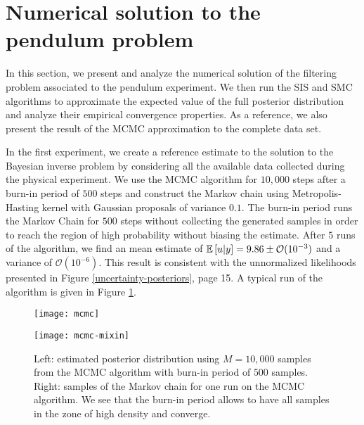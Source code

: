 \section{Numerical solution to the pendulum problem}
In this section, we present and analyze the numerical solution of the filtering problem associated to the pendulum experiment. We then run the SIS and SMC algorithms to approximate the expected value of the full posterior distribution and analyze their empirical convergence properties. As a reference, we also present the result of the MCMC approximation to the complete data set.

In the first experiment, we create a reference estimate to the solution to the Bayesian inverse problem by considering all the available data collected during the physical experiment. We use the MCMC algorithm for $10,000$ steps after a burn-in period of $500$ steps and construct the Markov chain using Metropolis-Hasting kernel with Gaussian proposals of variance $0.1$. The burn-in period runs the Markov Chain for $500$ steps without collecting the generated samples in order to reach the region of high probability without biasing the estimate. After $5$ runs of the algorithm, we find an mean estimate of $\mathbb{E}\left[u|y\right] = 9.86 \pm \mathcal{O}(10^{-3})$ and a variance of $\mathcal{O}(10^{-6})$. This result is consistent with the unnormalized likelihoods presented in Figure \ref{uncertainty-posteriors}, page 15. A typical run of the algorithm is given in Figure \ref{mcmc-figure}.

\begin{figure}[!t]
  \label{mcmc-figure}
  \begin{minipage}{.43\textwidth}
    \texttt{[image: mcmc]}
  \end{minipage}
  \begin{minipage}{.5\textwidth}
    \texttt{[image: mcmc-mixin]}
  \end{minipage}
  \caption{Left: estimated posterior distribution using $M=10,000$ samples from the MCMC algorithm with burn-in period of $500$ samples. Right: samples of the Markov chain for one run on the MCMC algorithm. We see that the burn-in period allows to have all samples in the zone of high density and converge.}
\end{figure}


